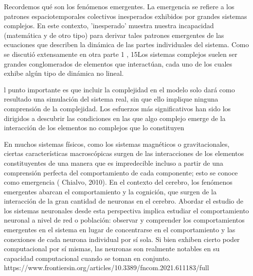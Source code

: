 Recordemos qué son los fenómenos emergentes. La emergencia se refiere a los patrones espaciotemporales colectivos inesperados exhibidos por grandes sistemas complejos. En este contexto, 'inesperado' muestra nuestra incapacidad (matemática y de otro tipo) para derivar tales patrones emergentes de las ecuaciones que describen la dinámica de las partes individuales del sistema. Como se discutió extensamente en otra parte 1 , 15Los sistemas complejos suelen ser grandes conglomerados de elementos que interactúan, cada uno de los cuales exhibe algún tipo de dinámica no lineal.


l punto importante es que incluir la complejidad en el modelo solo dará como resultado una simulación del sistema real, sin que ello implique ninguna comprensión de la complejidad. Los esfuerzos más significativos han sido los dirigidos a descubrir las condiciones en las que algo complejo emerge de la interacción de los elementos no complejos que lo constituyen


En muchos sistemas físicos, como los sistemas magnéticos o gravitacionales, ciertas características macroscópicas surgen de las interacciones de los elementos constituyentes de una manera que es impredecible incluso a partir de una comprensión perfecta del comportamiento de cada componente; esto se conoce como emergencia ( Chialvo, 2010). En el contexto del cerebro, los fenómenos emergentes abarcan el comportamiento y la cognición, que surgen de la interacción de la gran cantidad de neuronas en el cerebro. Abordar el estudio de los sistemas neuronales desde esta perspectiva implica estudiar el comportamiento neuronal a nivel de red o población: observar y comprender los comportamientos emergentes en el sistema en lugar de concentrarse en el comportamiento y las conexiones de cada neurona individual por sí sola. Si bien exhiben cierto poder computacional por sí mismas, las neuronas son realmente notables en su capacidad computacional cuando se toman en conjunto.
https://www.frontiersin.org/articles/10.3389/fncom.2021.611183/full




